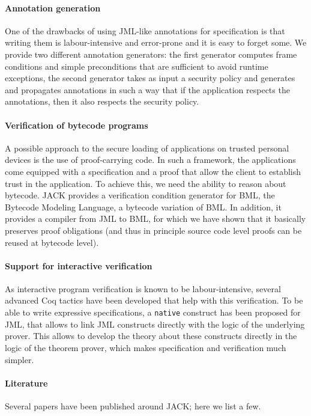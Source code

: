 \documentclass[]{llncs}
\begin{document}
\paragraph{Annotation generation}
One of the drawbacks of using JML-like annotations for specification
is that writing them is labour-intensive and error-prone and it is
easy to forget some. We provide two different annotation generators:
the first generator computes frame conditions and simple preconditions
that are sufficient to avoid runtime exceptions, the second generator
takes as input a security policy and generates and propagates
annotations in such a way that if the application respects the
annotations, then it also respects the security policy.

\paragraph{Verification of bytecode programs}
A possible approach to the secure loading of applications on trusted
personal devices is the use of proof-carrying code. In such a
framework, the applications come equipped with a specification and a
proof that allow the client to establish trust in the application. To
achieve this, we need the ability to reason about bytecode. JACK
provides a verification condition generator for BML, the Bytecode
Modeling Language, a bytecode variation of BML. In addition, it
provides a compiler from JML to BML, for which we have shown that it
basically preserves proof obligations (and thus in principle source
code level proofs can be reused at bytecode level).

\paragraph{Support for interactive verification}
As interactive program verification is known to be labour-intensive,
several advanced Coq tactics have been developed that help with this
verification. To be able to write expressive specifications, a
\texttt{native} construct has been proposed for JML, that allows to
link JML constructs directly with the logic of the underlying
prover. This allows to develop the theory about these constructs
directly in the logic of the theorem prover, which makes specification
and verification much simpler.

\paragraph{Literature}
Several papers have been published around JACK; here we list a few.

\nocite{BRL03:fme,Charles06,m+04:cardis,BurdyP06}



\end{document}
